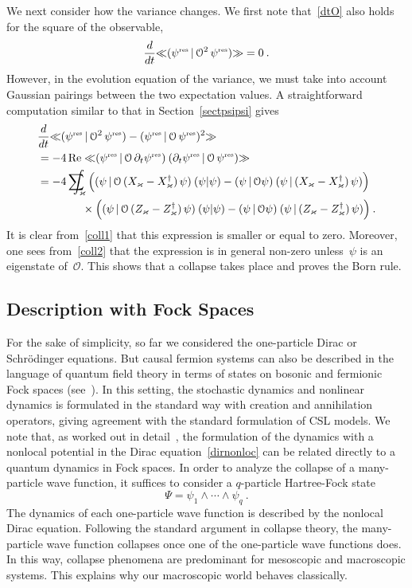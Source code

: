 \documentclass[reqno,11pt]{amsart}
\numberwithin{equation}{section}
\newcommand{\beq}{\begin{equation}}
\newcommand{\eeq}{\end{equation}}
\newcommand{\bbra}{\mathopen{\ll}}
\newcommand{\kket}{\mathclose{\gg}}
\newcommand{\1}{\mathds{1}}
\DeclareMathOperator{\re}{Re}
\newcommand{\sint}{\sum  \!\!\!\!\!\!\! \int }
\newcommand{\res}{\text{\rm{\tiny{res}}}}
\begin{document}
{We next consider how the variance changes. We first note that~\eqref{dtO} also holds for the
square of the observable,
\[ \frac{d}{dt} \bbra (\psi^\res \,|\, {\mathcal{O}}^2 \, \psi^\res) \kket = 0 \:. \]
However, in the evolution equation of the variance, we must take into account Gaussian pairings between
the two expectation values. A straightforward computation similar to that in Section~\ref{sectpsipsi} gives
\begin{align}
&\frac{d}{dt} \bbra (\psi^\res \,|\, {\mathcal{O}}^2 \, \psi^\res) - (\psi^\res \,|\, {\mathcal{O}} \, \psi^\res)^2 \kket \notag \\
&= - 4 \re \;\bbra (\psi^\res \,|\, {\mathcal{O}} \, \partial_t \psi^\res)\: (\partial_t \psi^\res \,|\, {\mathcal{O}} \, \psi^\res) \kket \label{coll1} \\
&= - 4 \sint_\varkappa \Big( (\psi \,|\, {\mathcal{O}}\, (X_\varkappa - X_\varkappa^\dagger)\, \psi) \: (\psi | \psi) - 
(\psi \,|\, {\mathcal{O}} \psi) \: (\psi \,|\, (X_\varkappa - X_\varkappa^\dagger)\, \psi) \Big) \notag \\
&\qquad \qquad \times \Big( (\psi \,|\, {\mathcal{O}}\, (Z_\varkappa - Z_\varkappa^\dagger)\, \psi) \: (\psi | \psi) - 
(\psi \,|\, {\mathcal{O}} \psi) \: (\psi \,|\, (Z_\varkappa - Z_\varkappa^\dagger)\, \psi) \Big) \:. \label{coll2}
\end{align}
It is clear from~\eqref{coll1} that this expression is smaller or equal to zero.
Moreover, one sees from~\eqref{coll2} that the expression is in general non-zero
unless~$\psi$ is an eigenstate of~${\mathcal{O}}$.
This shows that a collapse takes place and proves the Born rule.

\subsection{Description with Fock Spaces} \label{secfock}
For the sake of simplicity, so far we considered the one-particle Dirac or Schr\"odinger equations.
But causal fermion systems can also be described in the language of quantum field theory
in terms of states on bosonic and fermionic Fock spaces (see~\cite{fockbosonic, fockfermionic, fockentangle}).
In this setting, the stochastic dynamics and nonlinear dynamics
is formulated in the standard way with creation and annihilation operators, giving agreement with
the standard formulation of CSL models.
We note that, as worked out in detail~\cite{fockdynamics}, the formulation of the dynamics with a nonlocal
potential in the Dirac equation~\eqref{dirnonloc} can be related directly to a quantum dynamics in Fock spaces.
In order to analyze the collapse of a many-particle wave function, it suffices to consider a $q$-particle
Hartree-Fock state
\beq \label{HF}
\Psi = \psi_1 \wedge \cdots \wedge \psi_q \:.
\eeq
The dynamics of each one-particle wave function is described by the nonlocal Dirac equation.
Following the standard argument in collapse theory, the many-particle wave function collapses once
one of the one-particle wave functions does. In this way, collapse phenomena are predominant for
mesoscopic and macroscopic systems. This explains why our macroscopic world behaves classically.

}
\end{document}
